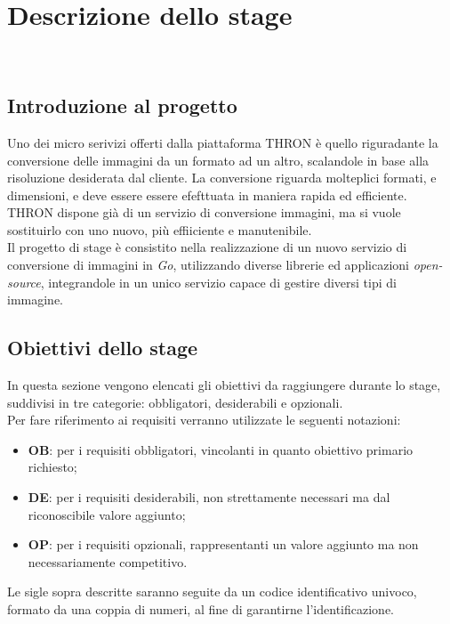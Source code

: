 \chapter{Descrizione dello stage}
\label{cap:descrizione-stage}

\\

\section{Introduzione al progetto}
Uno dei micro serivizi offerti dalla piattaforma THRON è quello riguradante la
conversione delle immagini da un formato ad un altro, scalandole in base alla
risoluzione desiderata dal cliente. La conversione riguarda molteplici formati,
e dimensioni, e deve essere essere efefttuata in maniera rapida ed efficiente.
THRON dispone già di un servizio di conversione immagini, ma si vuole
sostituirlo con uno nuovo, più effiiciente e manutenibile. \\
Il progetto di stage è consistito nella realizzazione di un nuovo servizio di
conversione di immagini in \emph{Go}, utilizzando diverse librerie ed
applicazioni \emph{\glsfirstoccur\gls{open-source}}, integrandole in un unico servizio
capace di gestire diversi tipi di immagine.\\

\section{Obiettivi dello stage}
\label{sec:obiettivi}
In questa sezione vengono elencati gli obiettivi da raggiungere durante lo
stage, suddivisi in tre categorie: obbligatori, desiderabili e opzionali.\\
Per fare riferimento ai requisiti verranno utilizzate le seguenti notazioni:
\begin{itemize}
    \item \textbf{OB}: per i requisiti obbligatori, vincolanti in quanto obiettivo
          primario richiesto;
    \item \textbf{DE}: per i requisiti desiderabili, non strettamente necessari
          ma dal riconoscibile valore aggiunto;
    \item \textbf{OP}: per i requisiti opzionali, rappresentanti un valore
          aggiunto ma non necessariamente competitivo.
\end{itemize}
Le sigle sopra descritte saranno seguite da un codice identificativo univoco,
formato da una coppia di numeri, al fine di garantirne l'identificazione.\\
